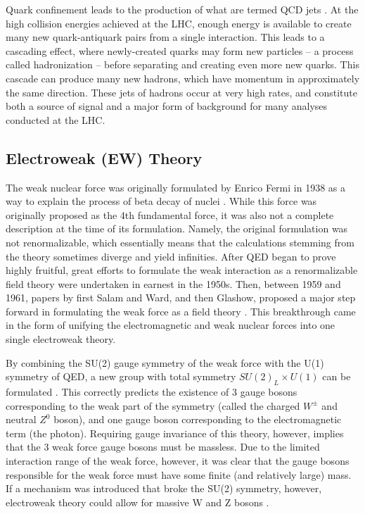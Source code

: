\documentclass[12pt]{ucsddissertation}
\begin{document}
Quark confinement leads to the production of what are termed QCD jets \cite{PDGReview}. At the high collision energies achieved at the LHC, enough energy is available to create many new quark-antiquark pairs from a single interaction. This leads to a cascading effect, where newly-created quarks may form new particles -- a process called hadronization -- before separating and creating even more new quarks. This cascade can produce many new hadrons, which have momentum in approximately the same direction. These jets of hadrons occur at very high rates, and constitute both a source of signal and a major form of background for many analyses conducted at the LHC.

\subsection{Electroweak (EW) Theory}\label{sec:EW}
The weak nuclear force was originally formulated by Enrico Fermi in 1938 as a way to explain the process of beta decay of nuclei \cite{FermiWeakPaper}. While this force was originally proposed as the 4th fundamental force, it was also not a complete description at the time of its formulation. Namely, the original formulation was not renormalizable, which essentially means that the calculations stemming from the theory sometimes diverge and yield infinities. After QED began to prove highly fruitful, great efforts to formulate the weak interaction as a renormalizable field theory were undertaken in earnest in the 1950s. Then, between 1959 and 1961, papers by first Salam and Ward, and then Glashow, proposed a major step forward in formulating the weak force as a field theory \cite{SalamAndWardEW} \cite{GlashowEW}. This breakthrough came in the form of unifying the electromagnetic and weak nuclear forces into one single electroweak theory. 

By combining the SU(2) gauge symmetry of the weak force with the U(1) symmetry of QED, a new group with total symmetry $SU(2)_L \times U(1)$ can be formulated \cite{PDGReview}. This correctly predicts the existence of 3 gauge bosons corresponding to the weak part of the symmetry (called the charged $W^{\pm}$ and neutral $Z^0$ boson), and one gauge boson corresponding to the electromagnetic term (the photon). Requiring gauge invariance of this theory, however, implies that the 3 weak force gauge bosons must be massless. Due to the limited interaction range of the weak force, however, it was clear that the gauge bosons responsible for the weak force must have some finite (and relatively large) mass. If a mechanism was introduced that broke the SU(2) symmetry, however, electroweak theory could allow for massive W and Z bosons \cite{SMOverview}.
\end{document}
